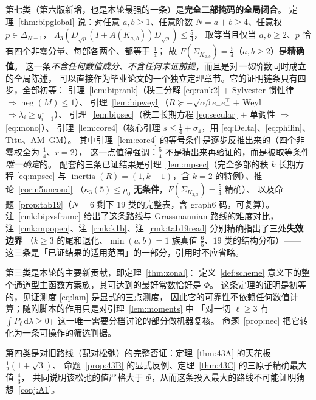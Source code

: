 \documentclass[UTF8,11pt]{ctexart}
\theoremstyle{definition}
\newcommand{\Lam}{\Lambda}
\newcommand{\dd}{\,\mathrm{d}}
\begin{document}
第七类（第六版新增，也是本轮最强的一条）是\textbf{完全二部掩码的全局闭合}。
定理~\ref{thm:bipglobal} 说：对任意 $a,b\ge1$、任意阶数 $N=a+b\ge4$、任意权 $p\in\Delta_{N-1}$，
$\Lam_3(D_{\sqrt p}(I+A(K_{a,b}))D_{\sqrt p})\le\frac54$，
取等当且仅当 $a,b\ge2$、$p$ 恰有四个非零分量、每部各两个、都等于 $\frac14$；
故 $F(\Sigma_{K_{a,b}})=\frac54$（$a,b\ge2$）是\textbf{精确值}。
这一条\emph{不含任何数值成分、不含任何未证前提}，而且是对\emph{一切}阶数同时成立的全局陈述，
可以直接作为毕业论文的一个独立定理章节。它的证明链条只有四步，全部初等：
引理~\ref{lem:biprank}（秩二分解 \eqref{eq:rank2} $+$ Sylvester 惯性律 $\Rightarrow\operatorname{neg}(M)\le1$）、
引理~\ref{lem:bipweyl}（$R\succeq-\sqrt{\alpha\beta}e_-e_-^\top$ $+$ Weyl $\Rightarrow\lambda_i\ge q^\downarrow_{i+1}$）、
引理~\ref{lem:bipsec}（秩二长期方程 \eqref{eq:secular} $+$ 单调性 $\Rightarrow$ \eqref{eq:mono}）、
引理~\ref{lem:core4}（核心引理 $s\le\frac14+\sigma_4$，用 \eqref{eq:Delta}、\eqref{eq:philin}、Titu、AM--GM）。
其中引理~\ref{lem:core4} 的等号条件是逐步反推出来的（四个非零权全为 $\frac14$、$r=2$），
这一点值得强调：$\frac54$ 不是猜出来再验证的，而是被取等条件\emph{唯一确定}的。
配套的三条已证结果是引理~\ref{lem:mpsec}（完全多部的秩 $k$ 长期方程 \eqref{eq:mpsec} 与
$\operatorname{inertia}(R)=(1,k-1)$，含 $k=2$ 的特例）、推论~\ref{cor:n5uncond}
（$\kappa_3(5)\le\rho_0$ \textbf{无条件}，$F(\Sigma_{K_{2,3}})=\frac54$ 精确）、
以及命题~\ref{prop:tab19}（$N=6$ 剩下 $19$ 类的完整表，含 graph6 码，可复算）。
注~\ref{rmk:bipvsframe} 给出了这条路线与 Grassmannian 路线的难度对比，
注~\ref{rmk:mpopen}、注~\ref{rmk:k1b}、注~\ref{rmk:tab19read} 分别精确指出了三处\textbf{失效边界}
（$k\ge3$ 的尾和退化、$\min(a,b)=1$ 族真值 $\frac65$、$19$ 类的结构分布）——
这三条是「已证结果的适用范围」的一部分，引用时不应省略。

第三类是本轮的主要新贡献，即定理~\ref{thm:zonal}：
定义~\ref{def:scheme} 意义下的整个通道型主函数方案族，其可达到的最好常数恰好是 $\Phi$。
这条定理的证明是初等的，见证测度 \eqref{eq:lam} 是显式的三点测度，
因此它的可靠性不依赖任何数值计算；随附脚本的作用只是对引理~\ref{lem:moments} 中
「对一切 $\ell\ge3$ 有 $\int P_\ell\dd\lambda\ge0$」这一唯一需要分档讨论的部分做机器复核。
命题~\ref{prop:nec} 把它转化为一条可操作的筛选判据。

第四类是对旧路线（配对松弛）的完整否证：定理~\ref{thm:43A} 的天花板 $\frac12(1+\sqrt3)$、
命题~\ref{prop:43B} 的显式反例、定理~\ref{thm:43C} 的三原子精确最大值 $\frac43$，
共同说明该松弛的值严格大于 $\Phi$，从而这条投入最大的路线不可能证明猜想~\ref{conj:A1}。
\end{document}
